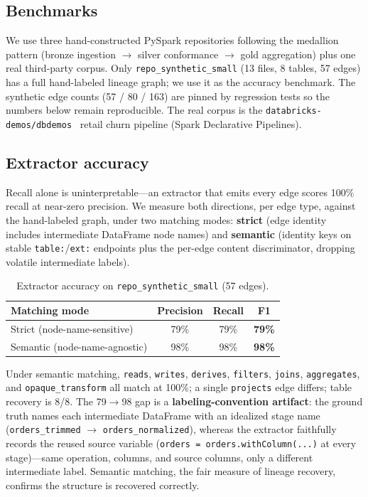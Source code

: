 \documentclass[11pt]{article}
\newcommand{\code}[1]{\texttt{#1}}
\begin{document}
\subsection{Benchmarks}
We use three hand-constructed PySpark repositories following the medallion pattern
(bronze ingestion $\rightarrow$ silver conformance $\rightarrow$ gold aggregation)
plus one real third-party corpus. Only \code{repo_synthetic_small} (13 files, 8
tables, 57 edges) has a full hand-labeled lineage graph; we use it as the accuracy
benchmark. The synthetic edge counts (57 / 80 / 163) are pinned by regression tests
so the numbers below remain reproducible. The real corpus is the
\code{databricks-demos/\allowbreak dbdemos}~\cite{dbdemos} retail churn pipeline (Spark Declarative Pipelines).

\subsection{Extractor accuracy}
\label{sec:extractor}
Recall alone is uninterpretable---an extractor that emits every edge scores 100\%
recall at near-zero precision. We measure both directions, per edge type, against
the hand-labeled graph, under two matching modes: \textbf{strict} (edge identity
includes intermediate DataFrame node names) and \textbf{semantic} (identity keys on
stable \code{table:}/\code{ext:} endpoints plus the per-edge content discriminator,
dropping volatile intermediate labels).

\begin{table}[h]
\centering
\caption{Extractor accuracy on \code{repo_synthetic_small} (57 edges).}
\label{tab:extractor}
\small
\begin{tabular}{@{}lccc@{}}
\toprule
Matching mode & Precision & Recall & F1 \\
\midrule
Strict (node-name-sensitive)   & 79\% & 79\% & \textbf{79\%} \\
Semantic (node-name-agnostic)  & 98\% & 98\% & \textbf{98\%} \\
\bottomrule
\end{tabular}
\end{table}

Under semantic matching, \code{reads}, \code{writes}, \code{derives},
\code{filters}, \code{joins}, \code{aggregates}, and \code{opaque_transform} all
match at 100\%; a single \code{projects} edge differs; table recovery is 8/8. The
79$\rightarrow$98 gap is a \textbf{labeling-convention artifact}: the ground truth
names each intermediate DataFrame with an idealized stage name
(\code{orders_trimmed} $\rightarrow$ \code{orders_normalized}), whereas the extractor
faithfully records the reused source variable (\code{orders = orders.\allowbreak withColumn(.\allowbreak .\allowbreak .\allowbreak )}
at every stage)---same operation, columns, and source columns, only a different
intermediate label. Semantic matching, the fair measure of lineage recovery,
confirms the structure is recovered correctly.
\end{document}
